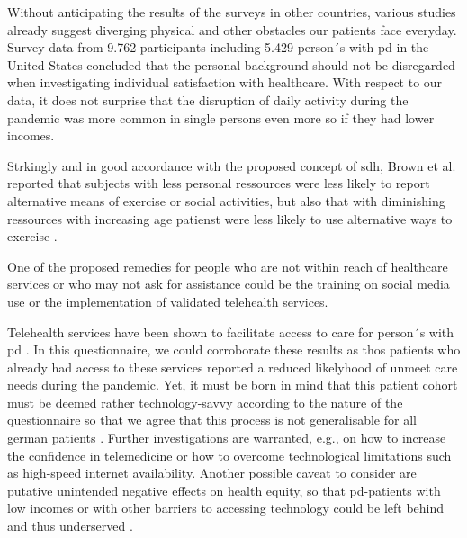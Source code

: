 \documentclass{bmcart}
\begin{document}
Without anticipating the results of the surveys in other countries, various studies already suggest diverging physical and other obstacles our patients face everyday. Survey data from 9.762 participants including 5.429 person´s with \ac{pd} in the United States concluded that the personal background should not be disregarded when investigating individual satisfaction with healthcare. With respect to our data, it does not surprise that the disruption of daily activity during the pandemic was more common in single persons even more so if they had lower incomes. 


Strkingly and in good accordance with the proposed concept of \ac{sdh}, Brown et al. reported that subjects with less personal ressources were less likely to report alternative means of exercise or social activities, but also that with diminishing ressources with increasing age patienst were less likely to use alternative ways to exercise \cite{brown2020effect}. 

One of the proposed remedies for people who are not within reach of healthcare services or who may  not ask for assistance could be the training on social media use or the implementation of validated telehealth services.


Telehealth services have been shown to facilitate access to care for person´s with \ac{pd} \cite{achey2014past, van2021state}. In this questionnaire, we could corroborate these results as thos patients who already had access to these services reported a reduced likelyhood of unmeet care needs during the pandemic. Yet, it must be born in mind that this patient cohort must be deemed rather technology-savvy according to the nature of the questionnaire so that we agree that this process is not generalisable for all german patients \cite{eggers2020care}. Further investigations are warranted, e.g., on how to increase the confidence in telemedicine or how to overcome technological limitations such as high-speed internet availability. Another possible caveat to consider are putative unintended negative effects on health equity, so that \ac{pd}-patients with low incomes or with other barriers to accessing technology could be left behind and thus underserved \cite{samuels2021digital}. 
\end{document}
